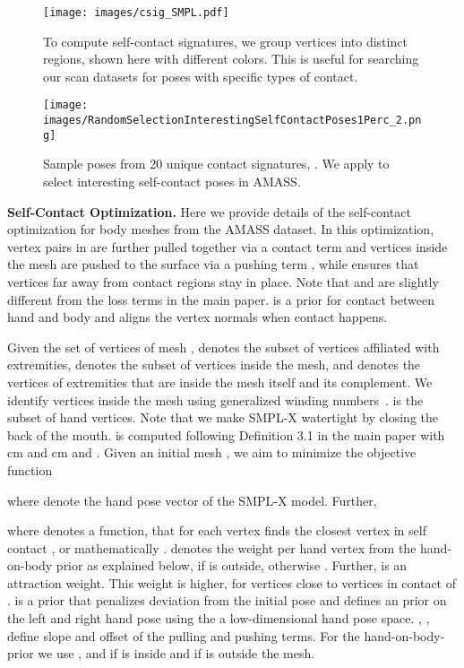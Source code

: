 \documentclass[final]{cvpr}
\theoremstyle{definition}
\begin{document}
\begin{figure}[t]
	\centerline{	\texttt{[image: images/csig\_SMPL.pdf]}
	}
	\caption{To compute self-contact signatures, we group vertices into distinct regions, shown here with different colors.
		This is useful for searching our scan datasets for poses with specific types of contact.}
	\label{fig:csigSMPLSMPLX}
\end{figure}

\begin{figure}[t!]
\centerline{
\texttt{[image: images/RandomSelectionInterestingSelfContactPoses1Perc\_2.png]}}
\vspace{-0.06in}
	\caption{Sample poses from 20 unique contact signatures, . We apply  to select interesting self-contact poses in AMASS.}
	\label{fig:RandomSelectionInterestingSelfContactPoses1Perc}
\end{figure}

\textbf{Self-Contact Optimization.} Here we provide details of the self-contact optimization for body meshes from the AMASS dataset. In this optimization, vertex pairs in  are further pulled together via a contact term  and vertices inside the mesh are pushed to the surface via a pushing term , while  ensures that vertices far away from contact regions stay in place. Note that  and  are slightly different from the loss terms in the main paper.  is a prior for contact between hand and body and  aligns the vertex normals when contact happens.

Given the set of vertices  of mesh ,  denotes the subset of vertices affiliated with extremities,  denotes the subset of vertices inside the mesh, and  denotes the vertices of extremities that are inside the mesh itself and  its complement. 
We identify vertices inside the mesh using generalized winding numbers~\cite{jacobson2013robust}.  is the subset of hand vertices. Note that we make SMPL-X watertight by closing the back of the mouth.  is computed following Definition 3.1 
in the main paper with cm and cm and . Given an initial mesh , we aim to minimize the objective function


where  denote the hand pose vector of the SMPL-X model. Further, 






where  denotes a function, that for each vertex  finds the closest vertex in self contact , or mathematically .  denotes the weight per hand vertex from the hand-on-body prior  as explained below, if  is outside, otherwise . Further,  is an attraction weight. This weight is higher, for vertices close to vertices in contact of .  is a  prior that penalizes deviation from the initial pose and  defines an   prior on the left and right hand pose using the a low-dimensional hand pose space.
, ,  define slope and offset of the pulling and pushing terms. For the hand-on-body-prior we use , and  if  is inside and  if  is outside the mesh.
\end{document}
